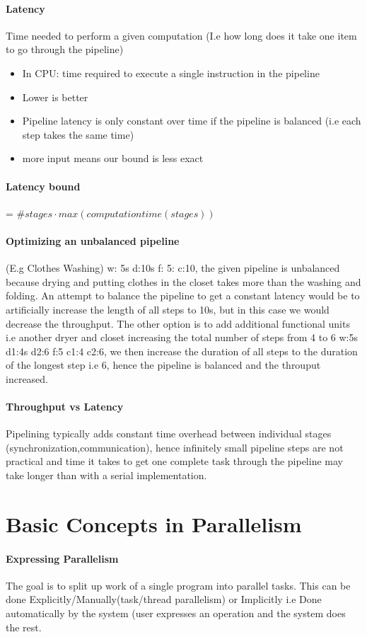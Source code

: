 \documentclass[8pt]{extreport}
\begin{document}
\paragraph{Latency} Time needed to perform a given computation (I.e how long does it take one item to go through the pipeline)
 \begin{itemize}
\item In CPU: time required to execute a single instruction in the pipeline
\item Lower is better
\item Pipeline latency is only constant over time if  the pipeline is balanced (i.e each step takes the same time)
\item more input means our bound is less exact
\end{itemize}
\paragraph{Latency bound} = $\#stages \cdot max(computationtime(stages))$
\paragraph{Optimizing an unbalanced pipeline} (E.g Clothes Washing) w: 5s d:10s f: 5: c:10, the given pipeline is unbalanced because drying and putting clothes in the closet takes more than the washing and folding. An attempt to balance the pipeline to get a constant latency would be to artificially increase the length of all steps to 10s, but in this case we would decrease the throughput. The other option is to add additional functional units i.e another dryer and closet increasing the total number of steps from 4 to 6 w:5s d1:4s d2:6 f:5 c1:4 c2:6, we then increase the duration of all steps to the duration of the longest step i.e 6, hence the pipeline is balanced and the throuput increased.
\paragraph{Throughput vs Latency} Pipelining typically adds constant time overhead between individual stages (synchronization,communication), hence infinitely small pipeline steps are not practical and time it takes to get one complete task through the pipeline may take longer than with a serial implementation.
\section{Basic Concepts in Parallelism}
\paragraph{Expressing Parallelism} The goal is to split up work of a single program into parallel tasks. This can be done Explicitly/Manually(task/thread parallelism) or Implicitly i.e Done automatically by the system (user expresses an operation and the system does the rest.
\end{document}
